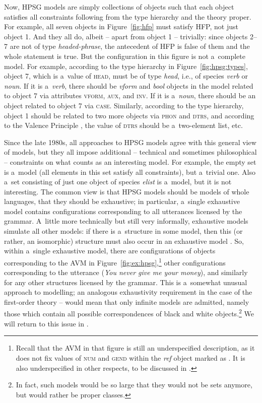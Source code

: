 \documentclass[output=paper,hidelinks]{langscibook}
\begin{document}
\largerpage
Now, HPSG models are simply collections of objects such that each object satisfies all constraints following from the type hierarchy and the theory proper.  For example, all seven objects in Figure~\ref{fig:hfp} must satisfy HFP, not just object 1.  And they all do, albeit -- apart from object 1 -- trivially: since objects 2--7 are not of type \textit{headed-phrase}, the antecedent of HFP is false of them and the whole statement is true.  But the configuration in this figure is not a~complete model.  For example, according to the type hierarchy in Figure~\ref{fig:hpsg:types}, object 7, which is a~value of \textsc{head}, must be of type \textit{head}, i.e., of species \textit{verb} or \textit{noun}.  If it is a~\textit{verb}, there should be \textit{vform} and \textit{bool} objects in the model related to object 7 via attributes \textsc{vform}, \textsc{aux}, and \textsc{inv}.  If it is a~\textit{noun}, there should be an object related to object 7 via \textsc{case}.  Similarly, according to the type hierarchy, object 1 should be related to two more objects via \textsc{phon} and \textsc{dtrs}, and according to the Valence Principle , the value of \textsc{dtrs} should be a~two-element list, etc.


\largerpage
Since the late 1980s, all approaches to HPSG models agree with this general view of models, but they all impose additional -- technical and sometimes philosophical -- constraints on what counts as an interesting model.  For example, the empty set is a~model (all elements in this set satisfy all constraints), but a~trivial one.  Also a~set consisting of just one object of species \textit{elist} is a~model, but it is not interesting.  The common view is that HPSG models should be models of whole languages, that they should be exhaustive; in particular, a~single exhaustive model contains configurations corresponding to all utterances licensed by the grammar.  A~little more technically but still very informally, exhaustive models simulate all other models: if there is a~structure in some model, then this (or rather, an isomorphic) structure must also occur in an exhaustive model \citep{king:99}.  So, within a~single exhaustive model, there are configurations of objects corresponding to the AVM in Figure~\ref{fig:ex:hpsg},\footnote{Recall that the AVM in that figure is still an underspecified description, as it does not fix values of \textsc{num} and \textsc{gend} within the \textit{ref} object marked as .  It is also underspecified in other respects, to be discussed in .} other configurations corresponding to the utterance  (\emph{You never give me your money}), and similarly for any other structures licensed by the grammar.  This is a~somewhat unusual approach to modelling; an analogous exhaustivity requirement in the case of the first-order theory -- would mean that only infinite models are admitted, namely those which contain all possible correspondences of black and white objects.\footnote{In fact, such models would be so large that they would not be sets anymore, but would rather be proper classes.}  We will return to this issue in .
\end{document}
